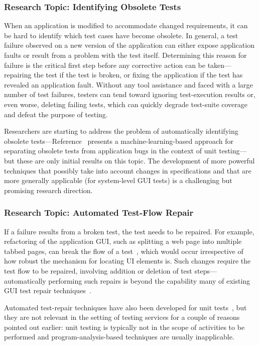 \vskip -5pt
\subsubsection*{Research Topic: Identifying Obsolete Tests}

When an application is modified to accommodate changed requirements, it can be
hard to identify which test cases have become obsolete.  In general, a test
failure observed on a new version of the application can either expose
application faults or result from a problem with the test itself. Determining
this reason for failure is the critical first step before any corrective action
can be taken---repairing the test if the test is broken, or fixing the
application if the test has revealed an application fault. Without any tool
assistance and faced with a large number of test failures, testers can tend
toward ignoring test-execution results or, even worse, deleting failing tests,
which can quickly degrade test-suite coverage and defeat the purpose of testing.

Researchers are starting to address the problem of automatically identifying
obsolete tests---\eg Reference~\cite{Hao:2013} presents a machine-learning-based
approach for separating obsolete tests from application bugs in the context of
unit testing---but these are only initial results on this topic. The development
of more powerful techniques that possibly take into account changes in
specifications and that are more generally applicable (\eg for system-level GUI
tests) is a challenging but promising research direction.

\vskip -5pt
\subsubsection*{Research Topic: Automated Test-Flow Repair}

If a failure results from a broken test, the test needs to be repaired.  For
example, refactoring of the application GUI, such as splitting a web page into
multiple tabbed pages, can break the flow of a test~\cite{thummalapenta:2013a},
which would occur irrespective of how robust the mechanism for locating UI
elements is. Such changes require the test flow to be repaired, involving
addition or deletion of test steps---automatically performing such repairs is
beyond the capability many of existing GUI test repair
techniques~\cite{Choudhary:2011, Grechanik:2009, Memon:2008}.

Automated test-repair techniques have also been developed for unit
tests~\cite{Daniel:2009, Daniel:2010, Mirzaaghaei:2012}, but they are not
relevant in the setting of testing services for a couple of reasons pointed out
earlier: unit testing is typically not in the scope of activities to be
performed and program-analysis-based techniques are usually inapplicable.

